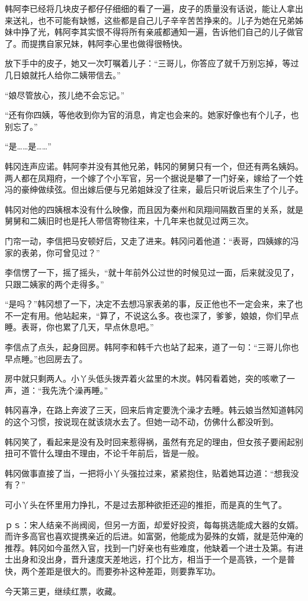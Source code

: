 韩阿李已经将几块皮子都仔仔细细的看了一遍，皮子的质量没有话说，能让人拿出来送礼，也不可能有缺憾，这些都是自己儿子辛辛苦苦挣来的。儿子为她在兄弟姊妹中挣了光，韩阿李其实恨不得将所有亲戚都通知一遍，告诉他们自己的儿子做官了。而提携自家兄妹，韩阿李心里也做得很畅快。

放下手中的皮子，她又一次叮嘱着儿子：“三哥儿，你答应了就千万别忘掉，等过几日娘就托人给你二姨带信去。”

“娘尽管放心，孩儿绝不会忘记。”

“还有你四姨，等他收到你为官的消息，肯定也会来的。她家好像也有个儿子，也别忘了。”

“是……是……”

韩冈连声应诺。韩阿李并没有其他兄弟，韩冈的舅舅只有一个，但还有两名姨妈。两人都在凤翔府，一个嫁了个小军官，另一个据说是攀了一门好亲，嫁给了一个姓冯的豪绅做续弦。但出嫁后便与兄弟姐妹没了往来，最后只听说后来生了个儿子。

韩冈对他的四姨根本没有什么映像，而且因为秦州和凤翔间隔数百里的关系，就是舅舅和二姨旧时也是托人带信寄物往来，十几年来也就见过两三次。

门帘一动，李信把马安顿好后，又走了进来。韩冈问着他道：“表哥，四姨嫁的冯家的表弟，你可曾见过？”

李信愣了一下，摇了摇头，“就十年前外公过世的时候见过一面，后来就没见了，只跟二姨家的两个走得多。”

“是吗？”韩冈想了一下，决定不去想冯家表弟的事，反正他也不一定会来，来了也不一定有用。他站起来，“算了，不说这么多。夜也深了，爹爹，娘娘，你们早点睡。表哥，你也累了几天，早点休息吧。”

李信点了点头，起身回房。韩阿李和韩千六也站了起来，道了一句：“三哥儿你也早点睡。”也回房去了。

房中就只剩两人。小丫头低头拨弄着火盆里的木炭。韩冈看着她，突的咳嗽了一声，道：“我先洗个澡再睡。”

韩冈喜净，在路上奔波了三天，回来后肯定要洗个澡才去睡。韩云娘当然知道韩冈的这个习惯，按说现在就该烧水去了。但她一动不动，仿佛什么都没听到。

韩冈笑了，看起来是没有及时回来惹得祸，虽然有充足的理由，但女孩子要闹起别扭可不管什么理由不理由，不论千年前后，皆是一般。

韩冈做事直接了当，一把将小丫头强拉过来，紧紧抱住，贴着她耳边道：“想我没有？”

可小丫头在怀里用力挣扎，不是过去那种欲拒还迎的推拒，而是真的生气了。

ｐｓ：宋人结亲不尚阀阅，但另一方面，却爱好投资，每每挑选能成大器的女婿。而许多高官也喜欢提携亲近的后进。如富弼，他能成为晏殊的女婿，就是范仲淹的推荐。韩冈如今虽然入官，找到一门好亲也有些难度，他缺着一个进士及第。有进士出身和没出身，晋升速度天差地远，打个比方，相当于一个是高铁，一个是普快，两个差距是很大的。而要弥补这种差距，则要靠军功。

今天第三更，继续红票，收藏。

